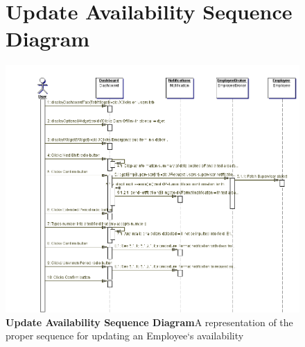 \documentclass[letterpaper,12pt]{report}
\begin{document}
\begin{figure}[hbp]
 \section{Update Availability Sequence Diagram}
 \includegraphics[scale=0.65]{diagrams/seqUpdateAvailability.png}
 \caption{\small
\textbf{Update Availability Sequence Diagram}\newline A representation of the proper sequence for updating an Employee`s availability}\label{fig:seqUpdateAvailability}
\end{figure}
\newpage
\end{document}

